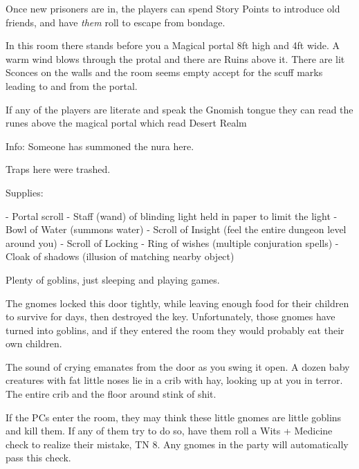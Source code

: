 \begin{multicols}{2}
Once new prisoners are in, the players can spend Story Points to introduce old friends, and have \textit{them} roll to escape from bondage.


\begin{boxtext}
In this room there stands before you a Magical portal 8ft high and 4ft wide. A warm wind blows through the protal and there are Ruins above it. There are lit Sconces on the walls and the room seems empty accept for the scuff marks leading to and from the portal. 
\end{boxtext}
If any of the players are literate and speak the Gnomish tongue they can read the runes above the magical portal which read Desert Realm

Info: Someone has summoned the nura here.

Traps here were trashed.

Supplies:

- Portal scroll
- Staff (wand) of blinding light held in paper to limit the light
- Bowl of Water (summons water)
- Scroll of Insight (feel the entire dungeon level around you)
- Scroll of Locking
- Ring of wishes (multiple conjuration spells)
- Cloak of shadows (illusion of matching nearby object)

\goblinnuramancer

\goblin


Plenty of goblins, just sleeping and playing games.

\goblin


\begin{exampletext}

	The gnomes locked this door tightly, while leaving enough food for their children to survive for days, then destroyed the key.
	Unfortunately, those gnomes have turned into goblins, and if they entered the room they would probably eat their own children.

\end{exampletext}

\begin{boxtext}

	The sound of crying emanates from the door as you swing it open.
	A dozen baby creatures with fat little noses lie in a crib with hay, looking up at you in terror.
	The entire crib and the floor around stink of shit.

\end{boxtext}

If the PCs enter the room, they may think these little gnomes are little goblins and kill them.
If any of them try to do so, have them roll a Wits + Medicine check to realize their mistake, TN 8.
Any gnomes in the party will automatically pass this check.

\end{multicols}

